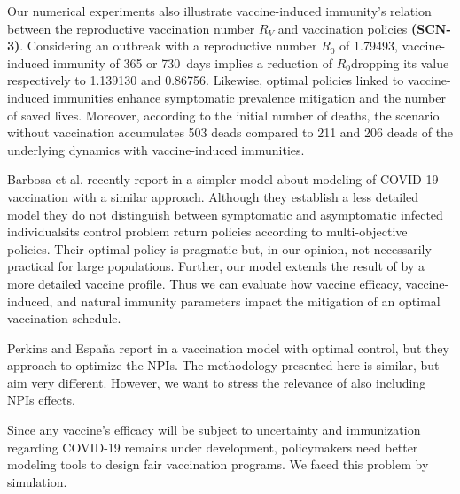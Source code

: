 Our numerical experiments also illustrate vaccine-induced immunity's
relation between the reproductive vaccination number $R_V$ and vaccination
policies \textbf{(SCN-3)}. Considering an outbreak with a reproductive number
$R_0$ of \num{1.794 93}, vaccine-induced immunity of \num{365} or
\SI{730}{days} implies a reduction of $R_0$\textemdash dropping its value
respectively to  \num{1.139130} and \num{.86756}.
Likewise, optimal policies linked to vaccine-induced immunities enhance
symptomatic prevalence mitigation and the number of saved lives. Moreover,
according to the initial number of deaths, the scenario without vaccination
accumulates \num{503} deads compared to \num{211} and \num{206} deads of the
underlying dynamics with vaccine-induced immunities.

%
Barbosa et al. recently report in \cite{Barbosa2020} a simpler model about
modeling of COVID-19 vaccination with a similar approach. Although they
establish a less detailed model \textemdash they do not distinguish between
symptomatic and asymptomatic infected individuals\textemdash its control
problem return policies according to multi-objective policies. Their optimal
policy is pragmatic but, in our opinion, not necessarily practical for large
populations. Further, our model extends the result of \cite{Barbosa2020} by a
more detailed vaccine profile. Thus we can evaluate how vaccine efficacy,
vaccine-induced, and natural immunity parameters impact the mitigation of an
optimal vaccination schedule.

Perkins and España report in \cite{Perkins2020} a vaccination model with
optimal control, but they approach to optimize the NPIs. The methodology
presented here is similar, but aim very different. However, we want to stress
the relevance of also including NPIs effects.

Since any vaccine's efficacy will be subject to uncertainty and immunization
regarding COVID-19 remains under development, policymakers need better modeling
tools to design fair vaccination programs. We faced this problem by simulation.

